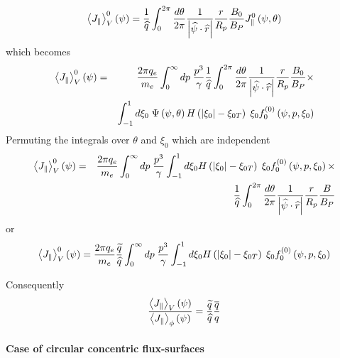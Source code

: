 \documentclass[12pt,a4paper]{article}
\begin{document}
\begin{equation}
\left\langle J_{\Vert }\right\rangle _{V}^{0}\left( \psi \right) =\frac{1}{%
\widehat{q}}\int_{0}^{2\pi }\frac{d\theta }{2\pi }\frac{1}{\left\vert 
\widehat{\psi }\cdot \widehat{r}\right\vert }\frac{r}{R_{p}}\frac{B_{0}}{%
B_{P}}J_{\Vert }^{0}\left( \psi ,\theta \right) 
\end{equation}%
which becomes%
\begin{eqnarray}
\left\langle J_{\Vert }\right\rangle _{V}^{0}\left( \psi \right)  &=&\frac{%
2\pi q_{e}}{m_{e}}\int_{0}^{\infty }dp\;\frac{p^{3}}{\gamma }\frac{1}{%
\widehat{q}}\int_{0}^{2\pi }\frac{d\theta }{2\pi }\frac{1}{\left\vert 
\widehat{\psi }\cdot \widehat{r}\right\vert }\frac{r}{R_{p}}\frac{B_{0}}{%
B_{P}}\times   \nonumber \\
&&\int_{-1}^{1}d\xi _{0}\;\Psi \left( \psi ,\theta \right) H\left(
\left\vert \xi _{0}\right\vert -\xi _{0T}\right) \;\xi _{0}f_{0}^{(0)}\left(
\psi ,p,\xi _{0}\right) 
\end{eqnarray}%
Permuting the integrals over $\theta $ and $\xi _{0}$ which are independent 
\begin{eqnarray}
\left\langle J_{\Vert }\right\rangle _{V}^{0}\left( \psi \right)  &=&\frac{%
2\pi q_{e}}{m_{e}}\int_{0}^{\infty }dp\;\frac{p^{3}}{\gamma }%
\int_{-1}^{1}d\xi _{0}H\left( \left\vert \xi _{0}\right\vert -\xi
_{0T}\right) \;\xi _{0}f_{0}^{(0)}\left( \psi ,p,\xi _{0}\right) \times  
\nonumber \\
&&\;\frac{1}{\widehat{q}}\int_{0}^{2\pi }\frac{d\theta }{2\pi }\frac{1}{%
\left\vert \widehat{\psi }\cdot \widehat{r}\right\vert }\frac{r}{R_{p}}\frac{%
B}{B_{P}}
\end{eqnarray}%
or%
\begin{equation}
\left\langle J_{\Vert }\right\rangle _{V}^{0}\left( \psi \right) =\frac{2\pi
q_{e}}{m_{e}}\frac{\widetilde{q}}{\widehat{q}}\int_{0}^{\infty }dp\;\frac{%
p^{3}}{\gamma }\int_{-1}^{1}d\xi _{0}H\left( \left\vert \xi _{0}\right\vert
-\xi _{0T}\right) \;\xi _{0}f_{0}^{(0)}\left( \psi ,p,\xi _{0}\right) 
\end{equation}

Consequently%
\begin{equation}
\frac{\left\langle J_{\Vert }\right\rangle _{V}\left( \psi \right) }{%
\left\langle J_{\Vert }\right\rangle _{\phi }\left( \psi \right) }=\frac{%
\widetilde{q}}{\widehat{q}}\frac{\overline{q}}{q}
\end{equation}

\paragraph{Case of circular concentric flux-surfaces}
\end{document}
